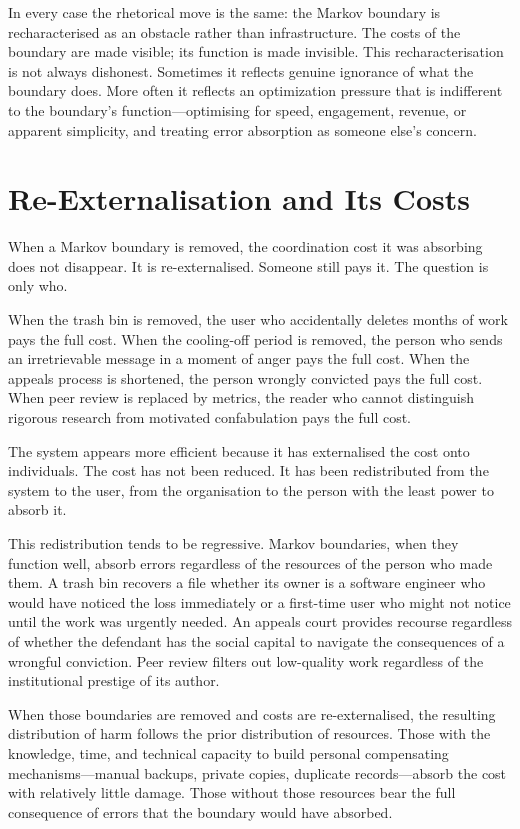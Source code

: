 \documentclass[12pt, a4paper]{article}
\begin{document}
In every case the rhetorical move is the same: the Markov boundary
is recharacterised as an obstacle rather than infrastructure. The
costs of the boundary are made visible; its function is made
invisible. This recharacterisation is not always dishonest.
Sometimes it reflects genuine ignorance of what the boundary does.
More often it reflects an optimization pressure that is indifferent
to the boundary's function---optimising for speed, engagement,
revenue, or apparent simplicity, and treating error absorption as
someone else's concern.

\section{Re-Externalisation and Its Costs}

When a Markov boundary is removed, the coordination cost it was
absorbing does not disappear. It is re-externalised. Someone still
pays it. The question is only who.

When the trash bin is removed, the user who accidentally deletes
months of work pays the full cost. When the cooling-off period is
removed, the person who sends an irretrievable message in a moment of
anger pays the full cost. When the appeals process is shortened, the
person wrongly convicted pays the full cost. When peer review is
replaced by metrics, the reader who cannot distinguish rigorous
research from motivated confabulation pays the full cost.

The system appears more efficient because it has externalised the cost
onto individuals. The cost has not been reduced. It has been
redistributed from the system to the user, from the organisation to
the person with the least power to absorb it.

This redistribution tends to be regressive. Markov boundaries, when
they function well, absorb errors regardless of the resources of the
person who made them. A trash bin recovers a file whether its owner
is a software engineer who would have noticed the loss immediately or
a first-time user who might not notice until the work was urgently
needed. An appeals court provides recourse regardless of whether the
defendant has the social capital to navigate the consequences of a
wrongful conviction. Peer review filters out low-quality work
regardless of the institutional prestige of its author.

When those boundaries are removed and costs are re-externalised, the
resulting distribution of harm follows the prior distribution of
resources. Those with the knowledge, time, and technical capacity to
build personal compensating mechanisms---manual backups, private
copies, duplicate records---absorb the cost with relatively little
damage. Those without those resources bear the full consequence of
errors that the boundary would have absorbed.
\end{document}
